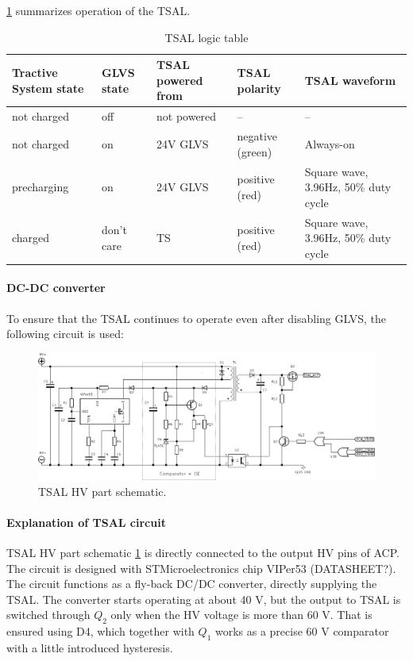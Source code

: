 \ref{fig:TSAL-logic-table} summarizes operation of the TSAL.

\begin{table}[H]
	\centering
	\caption{TSAL logic table}
	\begin{tabularx}{\textwidth}{|X|X|X|X|X|}
		\hline
		\textbf{Tractive System state} & \textbf{GLVS state} & \textbf{TSAL powered from} & \textbf{TSAL polarity} & \textbf{TSAL waveform} \\
		\hline
		not charged & off & not powered & -- & -- \\
		\hline
		not charged & on & 24V GLVS & negative (green) & Always-on \\
		\hline
		precharging & on & 24V GLVS & positive (red) & Square wave, 3.96Hz, 50\% duty cycle \\
		\hline
		charged & don't care & TS & positive (red) & Square wave, 3.96Hz, 50\% duty cycle \\
		\hline
	\end{tabularx}%
	\label{fig:TSAL-logic-table}
\end{table}%

\paragraph{DC-DC converter}

To ensure that the TSAL continues to operate even after disabling GLVS, the following circuit is used:

\begin{figure}[H]
	\centering
	\includegraphics[width=\textwidth]{./img/ECUA_TSAL_POWER.pdf}
	\caption{TSAL HV part schematic.}
	\label{fig:TSAL-HV}
\end{figure}

\paragraph{Explanation of TSAL circuit}
TSAL HV part schematic \ref{fig:TSAL-HV} is directly connected to the output HV pins of ACP. The circuit is designed with STMicroelectronics chip VIPer53 (DATASHEET?). The circuit functions as a fly-back DC/DC converter, directly supplying the TSAL. The converter starts operating at about 40 V, but the output to TSAL is switched through $Q_2$ only when the HV voltage is more than 60 V. That is ensured using D4, which together with $Q_1$ works as a precise 60 V comparator with a little introduced hysteresis.

